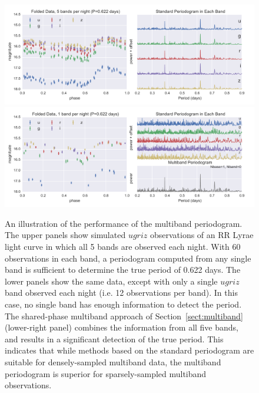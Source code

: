 \documentclass{emulateapj}
\newcommand{\figlabel}[1]{\label{fig:#1}}
\newcommand{\Sect}[1]{Section~\ref{sect:#1}}
\newcommand{\sect}[1]{\Sect{#1}}
\begin{document}
\begin{figure}
  \centering
  \includegraphics[width=\textwidth]{fig05a.pdf}
  \includegraphics[width=\textwidth]{fig05b.pdf}
  \caption{
    An illustration of the performance of the multiband periodogram. The
    upper panels show simulated $ugriz$ observations of an RR Lyrae light
    curve in which all 5 bands are observed each night. With 60 observations
    in each band, a periodogram computed from any single band is sufficient to
    determine the true period of 0.622 days. The lower panels show the same
    data, except with only a single $ugriz$ band observed each night (i.e.
    12 observations per band). In this case, no single band has enough
    information to detect the period. The shared-phase multiband approach
    of \sect{multiband} (lower-right panel) combines the information from
    all five bands, and results in a significant detection of the true period.
    This indicates that while methods based on the standard periodogram are
    suitable for densely-sampled multiband data, the multiband periodogram
    is superior for sparsely-sampled multiband observations.
  }
  \figlabel{multiband_sim}
\end{figure}
\end{document}
